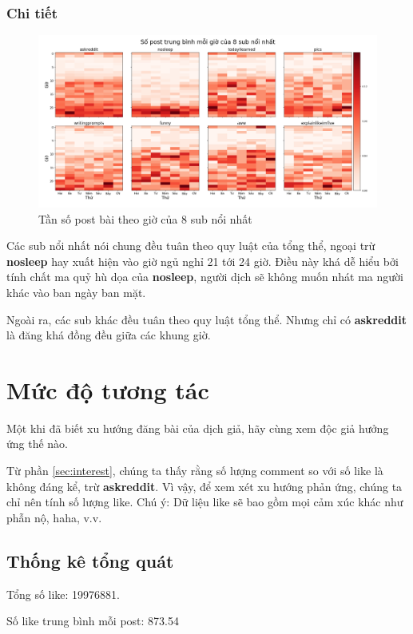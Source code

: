 \documentclass[10pt,a4paper]{article}
\begin{document}
\subsubsection{Chi tiết}
\begin{figure}[ht]
    \centering
    \includegraphics[width=\textwidth]{img/MeanPostsWeekdayHourPerSub.png}
    \caption{Tần số post bài theo giờ của 8 sub nổi nhất}
    \label{fig:meanpostsweekdayhourpersub}
\end{figure}

Các sub nổi nhất nói chung đều tuân theo quy luật của tổng thể, ngoại trừ \textbf{nosleep} hay xuất hiện vào giờ ngủ nghỉ 21 tới 24 giờ. Điều này khá dễ hiểu bởi tính chất ma quỷ hù dọa của \textbf{nosleep}, người dịch sẽ không muốn nhát ma người khác vào ban ngày ban mặt.

Ngoài ra, các sub khác đều tuân theo quy luật tổng thể. Nhưng chỉ có \textbf{askreddit} là đăng khá đồng đều giữa các khung giờ.

\clearpage
\section{Mức độ tương tác}
Một khi đã biết xu hướng đăng bài của dịch giả, hãy cùng xem độc giả hưởng ứng thế nào.

Từ phần \eqref{sec:interest}, chúng ta thấy rằng số lượng comment so với số like là không đáng kể, trừ \textbf{askreddit}. Vì vậy, để xem xét xu hướng phản ứng, chúng ta chỉ nên tính số lượng like. Chú ý: Dữ liệu like sẽ bao gồm mọi cảm xúc khác như phẫn nộ, haha, v.v.

\subsection{Thống kê tổng quát}
Tổng số like: 19976881.

Số like trung bình mỗi post: 873.54
\end{document}
